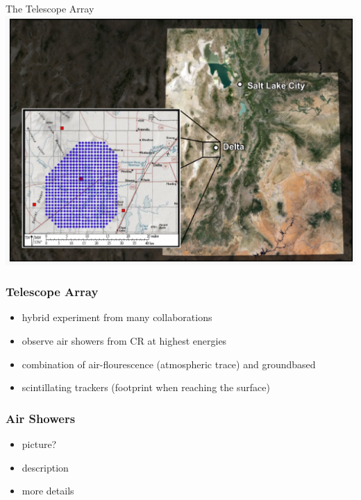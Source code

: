 \documentclass[aspectratio=1610, 9pt]{beamer}
\begin{document}
\begin{frame}{The Telescope Array}
  \includegraphics[width=\textwidth]{TCA.png}
\end{frame}

\begin{frame}\frametitle{Telescope Array}
  \begin{itemize}
    \item hybrid experiment from many collaborations
    \item observe air showers from CR at highest energies
    \item combination of air-flourescence (atmospheric trace) and groundbased
    \item scintillating trackers (footprint when reaching the surface)
  \end{itemize}
\end{frame}

\begin{frame}\frametitle{Air Showers}
  \begin{itemize}
    \item picture?
    \item description
    \item more details
  \end{itemize}
\end{frame}
\end{document}
